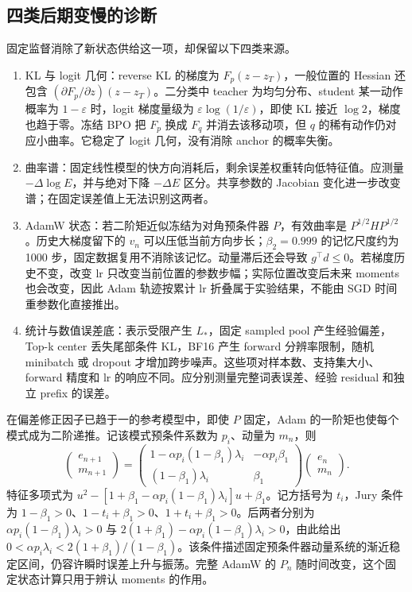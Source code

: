 \subsection{四类后期变慢的诊断}

固定监督消除了新状态供给这一项，却保留以下四类来源。
\begin{enumerate}
\item KL 与 logit 几何：reverse KL 的梯度为 $F_p(z-z_T)$，一般位置的 Hessian 还包含 $(\partial F_p/\partial z)(z-z_T)$。二分类中 teacher 为均匀分布、student 某一动作概率为 $1-\varepsilon$ 时，logit 梯度量级为 $\varepsilon\log(1/\varepsilon)$，即使 KL 接近 $\log2$，梯度也趋于零。冻结 BPO 把 $F_p$ 换成 $F_q$ 并消去该移动项，但 $q$ 的稀有动作仍对应小曲率。它稳定了 logit 几何，没有消除 anchor 的概率失衡。
\item 曲率谱：固定线性模型的快方向消耗后，剩余误差权重转向低特征值。应测量 $-\Delta\log E$，并与绝对下降 $-\Delta E$ 区分。共享参数的 Jacobian 变化进一步改变谱；在固定误差值上无法识别这两者。
\item AdamW 状态：若二阶矩近似冻结为对角预条件器 $P$，有效曲率是 $P^{1/2}HP^{1/2}$。历史大梯度留下的 $v_n$ 可以压低当前方向步长；$\beta_2=0.999$ 的记忆尺度约为 1000 步，固定数据复用不消除该记忆。动量滞后还会导致 $g^\top d\le0$。若梯度历史不变，改变 lr 只改变当前位置的参数步幅；实际位置改变后未来 moments 也会改变，因此 Adam 轨迹按累计 lr 折叠属于实验结果，不能由 SGD 时间重参数化直接推出。
\item 统计与数值误差底：表示受限产生 $L_*$，固定 sampled pool 产生经验偏差，Top-k center 丢失尾部条件 KL，BF16 产生 forward 分辨率限制，随机 minibatch 或 dropout 才增加跨步噪声。这些项对样本数、支持集大小、forward 精度和 lr 的响应不同。应分别测量完整词表误差、经验 residual 和独立 prefix 的误差。
\end{enumerate}

在偏差修正因子已趋于一的参考模型中，即使 $P$ 固定，Adam 的一阶矩也使每个模式成为二阶递推。记该模式预条件系数为 $p_i$、动量为 $m_n$，则
\begin{equation}
\begin{pmatrix}e_{n+1}\\m_{n+1}\end{pmatrix}
=\begin{pmatrix}
1-\alpha p_i(1-\beta_1)\lambda_i&-\alpha p_i\beta_1\\
(1-\beta_1)\lambda_i&\beta_1
\end{pmatrix}
\begin{pmatrix}e_n\\m_n\end{pmatrix}.
\end{equation}
特征多项式为 $u^2-[1+\beta_1-\alpha p_i(1-\beta_1)\lambda_i]u+\beta_1$。记方括号为 $t_i$，Jury 条件为 $1-\beta_1>0$、$1-t_i+\beta_1>0$、$1+t_i+\beta_1>0$。后两者分别为 $\alpha p_i(1-\beta_1)\lambda_i>0$ 与 $2(1+\beta_1)-\alpha p_i(1-\beta_1)\lambda_i>0$，由此给出 $0<\alpha p_i\lambda_i<2(1+\beta_1)/(1-\beta_1)$。该条件描述固定预条件器动量系统的渐近稳定区间，仍容许瞬时误差上升与振荡。完整 AdamW 的 $P_n$ 随时间改变，这个固定状态计算只用于辨认 moments 的作用。

